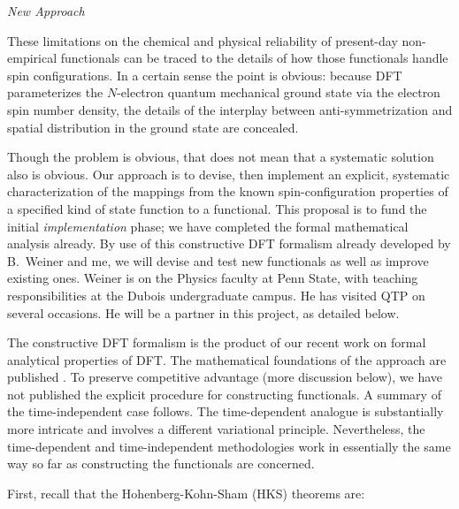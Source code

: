 \documentclass[nofootinbib,floatfix,aps,pra,preprint]{revtex4}
\begin{document}
\textrm{\vspace{1cm} \noindent \emph{New Approach} }

\textrm{These limitations on the chemical and physical reliability of
present-day non-empirical functionals can be traced to the details of how
those functionals handle spin configurations. In a certain sense the point
is obvious: because DFT parameterizes the $N$-electron quantum mechanical
ground state via the electron spin number density, the details of the
interplay between anti-symmetrization and spatial distribution in the ground
state are concealed. }

\textrm{Though the problem is obvious, that does not mean that a systematic
solution also is obvious. Our approach is to devise, then implement an
explicit, systematic characterization of the mappings from the known
spin-configuration properties of a specified kind of state function to a
functional. This proposal is to fund the initial \emph{implementation}
phase; we have completed the formal mathematical analysis already. By use of
this constructive DFT formalism already developed by B.~Weiner and me, we
will devise and test new functionals as well as improve existing ones.
Weiner is on the Physics faculty at Penn State, with teaching
responsibilities at the Dubois undergraduate campus. He has visited QTP on
several occasions. He will be a partner in this project, as detailed below. }

\textrm{The constructive DFT formalism is the product of our recent work on
formal analytical properties of DFT. The mathematical foundations of the
approach are published \cite{BLWSBT97,BLWSBT98,BLWSBT99}. To preserve
competitive advantage (more discussion below), we have not published the
explicit procedure for constructing functionals. A summary of the
time-independent case follows. The time-dependent analogue is substantially
more intricate and involves a different variational principle. Nevertheless,
the time-dependent and time-independent methodologies work in essentially
the same way so far as constructing the functionals are concerned. }

\textrm{First, recall that the Hohenberg-Kohn-Sham (HKS) theorems are: %
\renewcommand{\labelenumi}{\Roman{enumi}.} }
\end{document}
